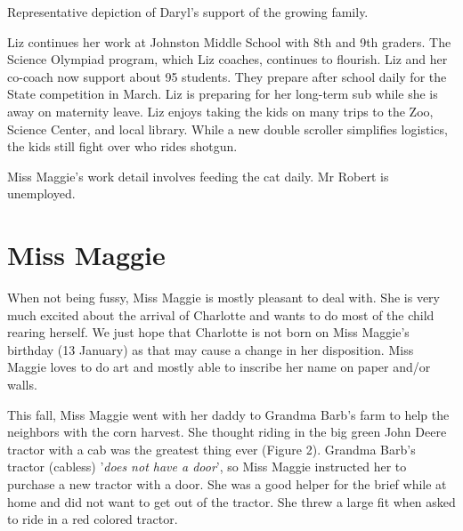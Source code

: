 \documentclass[letterpaper,11pt]{article}
\makeatletter
\newenvironment{figurehere}
  {\def\@captype{figure}}
  {}
\makeatother
\begin{document}
\begin{multicols}{2}
\begin{figurehere}
 \centering   
 \caption{Representative depiction of Daryl's support of the growing family.}
\end{figurehere}

Liz continues her work at Johnston Middle School with 8th and 9th graders. 
The Science Olympiad program, which Liz coaches, continues to flourish. 
Liz and her co-coach now support about 95 students.  They prepare
after school daily for the State competition in March.  Liz is preparing for
her long-term sub while she is away on maternity leave.
Liz enjoys taking the kids on many trips to the Zoo, Science Center, and local
library. While a new double scroller simplifies logistics, the kids
still fight over who rides shotgun.

Miss Maggie's work detail involves feeding the cat daily.  Mr Robert is
unemployed.

\section{Miss Maggie}

When not being fussy, Miss Maggie is mostly pleasant to deal with.  She is very
much excited about the arrival of Charlotte and wants to do most of the child
rearing herself. We just hope that Charlotte is not born on Miss Maggie's
birthday (13 January) as that may cause a change in her disposition.  Miss
Maggie loves to do art and mostly able to inscribe her name on paper and/or walls.

This fall, Miss Maggie went with her daddy to Grandma Barb's farm to help the
neighbors with the corn harvest.  She thought riding in the big green John Deere
tractor with a cab was the greatest thing ever (Figure 2).  Grandma Barb's
tractor (cabless) '\textit{does not have a door}', so Miss Maggie instructed her
to purchase a new tractor with a door.  She was a good helper for the brief
while at home and did not want to get out of the tractor. She threw a large fit
when asked to ride in a red colored tractor.


\end{multicols}
\end{document}

